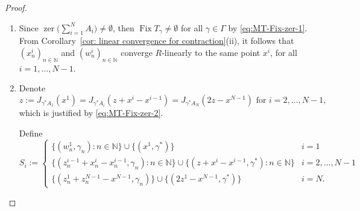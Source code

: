 \documentclass[a4paper,12pt]{article}
\DeclareMathOperator{\Fix}{Fix}
\DeclareMathOperator{\zer}{zer}
\begin{document}
\begin{proof}
\begin{enumerate}
    \item[(\ref{cor:MT fixed-point-convergence for contraction})] Since $\zer\bigl(\sum_{i=1}^NA_i\bigr)\neq\emptyset$, then $\Fix T_{\gamma}\neq\emptyset$ for all $\gamma\in\Gamma$ by \eqref{eq:MT-Fix-zer-1}. 
    From Corollary~\ref{cor: linear convergence for contraction}(ii), it follows that 
    $(x_n^i)_{n\in\mathbb{N}}$ and $(w_n^i)_{n\in\mathbb{N}}$ converge $R$-linearly to the same point $x^i$, for all $i=1,\dots, N-1$.
     \item[(\ref{cor:MT primal-convergence for contraction})] Denote \begin{equation} \label{eq:common-limit}
        z:=J_{\gamma^*A_1}(x^1)=J_{\gamma^*A_i}(z+x^i-x^{i-1})=J_{\gamma^*A_N}(2z-x^{N-1}) \text{~for~}i=2,\dots,N-1,
    \end{equation} 
    which is justified by \eqref{eq:MT-Fix-zer-2}. 
    
    Define 
    $$ S_i := \begin{cases}
    \{(w_n^1,\gamma_n):n\in\mathbb{N}\}\cup\{(x^1,\gamma^*)\} & i=1\\
    \{(z_{n}^{i-1}+x_n^i-x_n^{i-1},\gamma_n):n\in\mathbb{N}\}\cup\{(z+x^i-x^{i-1},\gamma^*):n\in\mathbb{N}\} &i=2,\dots,N-1\\
    \{(z_{n}^1+z_{n}^{N-1}-x^{N-1},\gamma_n)\}\cup\{(2z^1-x^{N-1},\gamma^*)\} & i=N.
              \end{cases} $$
    

\end{enumerate}
\end{proof}
\end{document}
